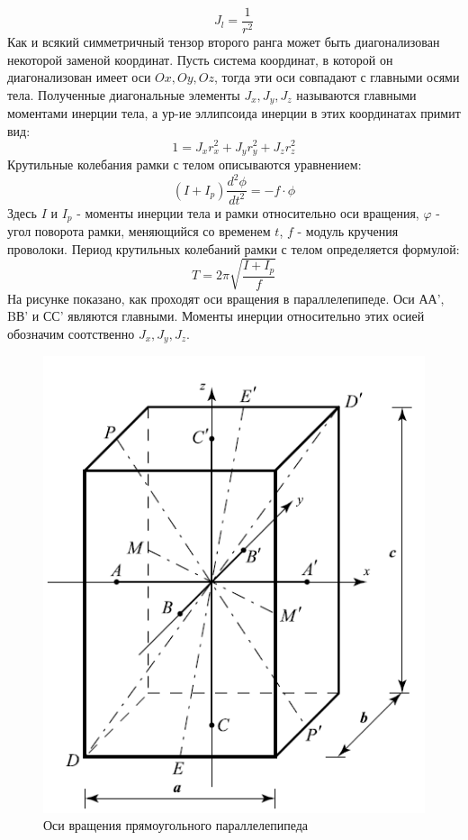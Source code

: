 \documentclass[a4paper,12pt]{article}
\begin{document}
\begin{equation}
    J_{l} = \frac{1}{r^2}
    \label{ссылка}
\end{equation}
Как и всякий симметричный тензор второго ранга может быть диагонализован некоторой заменой координат. 
Пусть система координат, в которой он диагонализован имеет оси $Ox,Oy,Oz$, тогда эти оси совпадают с главными осями тела.
Полученные диагональные элементы $J_{x}, J_{y}, J_{z}$ называются главными моментами инерции тела, а ур-ие эллипсоида
 инерции в этих координатах примит вид:
\begin{equation}
    1 = J_{x}r^{2}_{x}+J_{y}r^{2}_{y}+J_{z}r^{2}_{z}
\end{equation}
Крутильные колебания рамки с телом описываются уравнением:
\begin{equation}
    (I+I_{p})\frac{d^2 \phi}{d t^2} = -f \cdot \phi
\end{equation}
Здесь $I$ и $I_{p}$ - моменты инерции тела и рамки относительно
 оси вращения, $\varphi$ - угол поворота рамки, меняющийся со
временем $t$, $f$ - модуль кручения проволоки. Период крутильных
 колебаний рамки с телом определяется формулой:
\begin{equation}
    T = 2\pi\sqrt{\frac{I+I_{p}}{f}}
\end{equation}
На рисунке показано, как проходят оси вращения в параллелепипеде.
 Оси АА', BВ' и СС' являются главными. Моменты инерции относительно
этих осией обозначим соотственно $J_{x}, J_{y}, J_{z}$.\\

 \begin{figure}[!h]
    \begin{center}
        \includegraphics[scale=1]{kyb}
        \caption{Оси вращения прямоугольного параллелепипеда}
        \label{graphic1}
    \end{center}
\end{figure}
\end{document}
